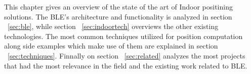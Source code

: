 
\label{cap:indoor}

This chapter gives an overview of the state of the art of Indoor positining solutions. The \acf{BLE}'s architecture and functionality is analyzed in section ~\ref{sec:ble}, while section ~\ref{sec:indoortech} overviews the other existing technologies. The most common techniques utilized for position computation along side examples which make use of them are explained in section ~\ref{sec:techniques}. Finnally on section ~\ref{sec:related} analyzes the most projects that had the most relevance in the field and the existing work related to \ac{BLE}.








\cleardoublepage
